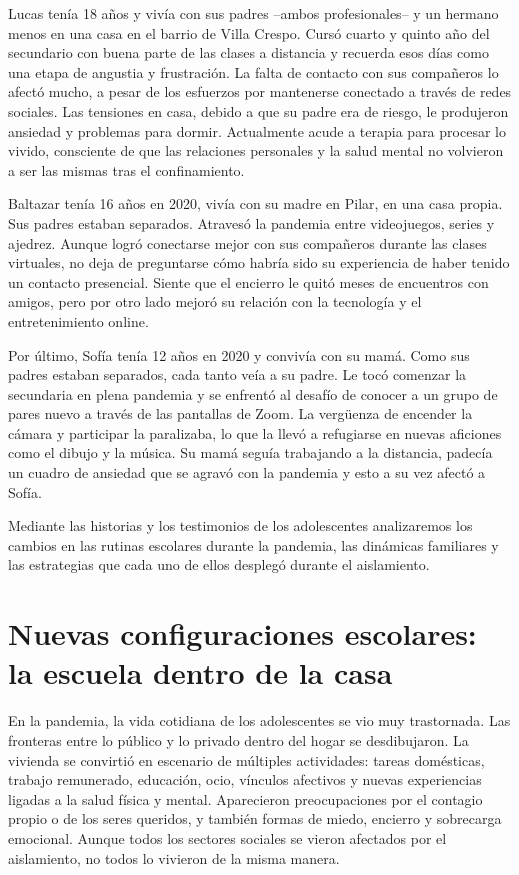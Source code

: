 \begin{refsection}
Lucas tenía 18 años y vivía con sus padres –ambos profesionales– y un hermano menos en una casa en el barrio de Villa Crespo. Cursó cuarto y quinto año del secundario con buena parte de las clases a distancia y recuerda esos días como una etapa de angustia y frustración. La falta de contacto con sus compañeros lo afectó mucho, a pesar de los esfuerzos por mantenerse conectado a través de redes sociales. Las tensiones en casa, debido a que su padre era de riesgo, le produjeron ansiedad y problemas para dormir. Actualmente acude a terapia para procesar lo vivido, consciente de que las relaciones personales y la salud mental no volvieron a ser las mismas tras el confinamiento.

Baltazar tenía 16 años en 2020, vivía con su madre en Pilar, en una casa propia. Sus padres estaban separados. Atravesó la pandemia entre videojuegos, series y ajedrez. Aunque logró conectarse mejor con sus compañeros durante las clases virtuales, no deja de preguntarse cómo habría sido su experiencia de haber tenido un contacto presencial. Siente que el encierro le quitó meses de encuentros con amigos, pero por otro lado mejoró su relación con la tecnología y el entretenimiento online.

Por último, Sofía tenía 12 años en 2020 y convivía con su mamá. Como sus padres estaban separados, cada tanto veía a su padre. Le tocó comenzar la secundaria en plena pandemia y se enfrentó al desafío de conocer a un grupo de pares nuevo a través de las pantallas de Zoom. La vergüenza de encender la cámara y participar la paralizaba, lo que la llevó a refugiarse en nuevas aficiones como el dibujo y la música. Su mamá seguía trabajando a la distancia, padecía un cuadro de ansiedad que se agravó con la pandemia y esto a su vez afectó a Sofía.

Mediante las historias y los testimonios de los adolescentes analizaremos los cambios en las rutinas escolares durante la pandemia, las dinámicas familiares y las estrategias que cada uno de ellos desplegó durante el aislamiento.


\section[Nuevas configuraciones escolares: la escuela dentro de la casa]{Nuevas configuraciones escolares: la escuela dentro de la casa}
\label{cap-26.nuevas-configuraciones-escolares-la-escuela-dentro-de-la-casa}
En la pandemia, la vida cotidiana de los adolescentes se vio muy trastornada. Las fronteras entre lo público y lo privado dentro del hogar se desdibujaron. La vivienda se convirtió en escenario de múltiples actividades: tareas domésticas, trabajo remunerado, educación, ocio, vínculos afectivos y nuevas experiencias ligadas a la salud física y mental. Aparecieron preocupaciones por el contagio propio o de los seres queridos, y también formas de miedo, encierro y sobrecarga emocional. Aunque todos los sectores sociales se vieron afectados por el aislamiento, no todos lo vivieron de la misma manera.


\end{refsection}
